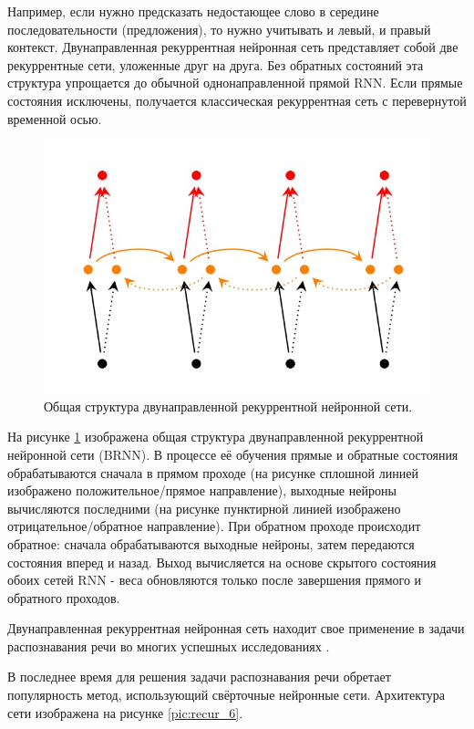\begin{itemize}
\begin{itemize}
Например, если нужно предсказать недостающее слово в середине последовательности (предложения), то нужно учитывать и левый, и правый контекст. 
Двунаправленная рекуррентная нейронная сеть представляет собой две рекуррентные сети, уложенные друг на друга. 
Без обратных состояний эта структура упрощается до обычной однонаправленной прямой RNN. 
Если прямые состояния исключены, получается классическая рекуррентная сеть с перевернутой временной осью.

\begin{figure}[h]
\includegraphics[width=0.75\columnwidth]{./img/recur_5.jpg}
\centering
\caption{Общая структура двунаправленной рекуррентной нейронной сети.}
\label{pic:recur_5}
\end{figure}


На рисунке \ref{pic:recur_5} изображена общая структура двунаправленной рекуррентной нейронной сети (BRNN). 
В процессе её обучения прямые и обратные состояния обрабатываются сначала в прямом проходе 
(на рисунке сплошной линией изображено положительное/прямое направление), выходные нейроны вычисляются последними 
(на рисунке пунктирной линией изображено отрицательное/обратное направление). 
При обратном проходе происходит обратное: сначала обрабатываются выходные нейроны, затем передаются состояния вперед и назад. 
Выход вычисляется на основе скрытого состояния обоих сетей RNN - веса обновляются только после завершения прямого и обратного проходов.

Двунаправленная рекуррентная нейронная сеть находит свое применение в задачи распознавания речи во многих успешных исследованиях \cite{3_recur}.

В последнее время для решения задачи распознавания речи обретает популярность \cite{4_recur}\cite{5_recur}\cite{6_recur} метод, 
использующий свёрточные нейронные сети. Архитектура сети изображена на рисунке \ref{pic:recur_6}.


\end{itemize}
\end{itemize}
